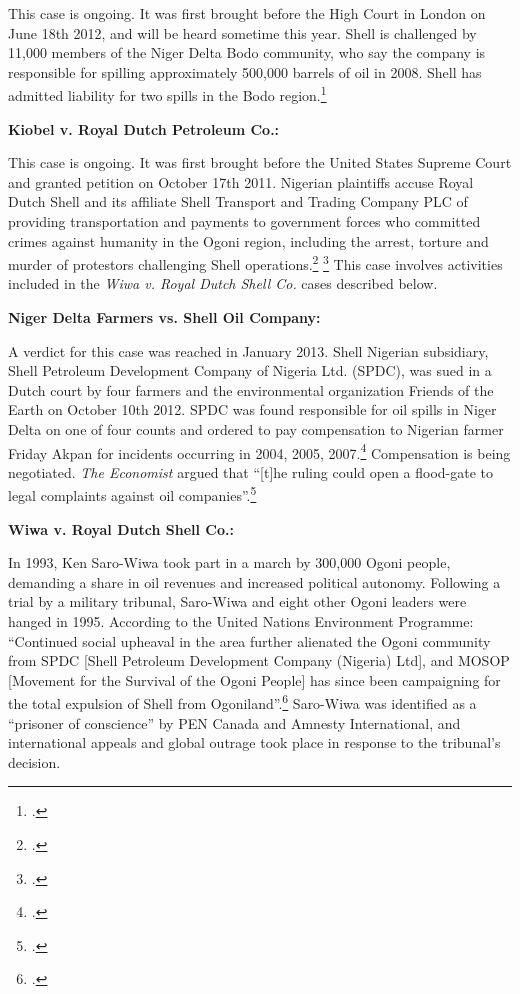 \documentclass[10pt]{article}
\begin{document}
This case is ongoing. 
It was first brought before the High Court in London on June 18th 2012, and will be heard sometime this year. 
Shell is challenged by 11,000 members of the Niger Delta Bodo community, who say the company is responsible for spilling approximately 500,000 barrels of oil in 2008. 
Shell has admitted liability for two spills in the Bodo region.\footcite{DutchResponsible}



\textbf{Kiobel v. Royal Dutch Petroleum Co.:} 



This case is ongoing. 
It was first brought before the United States Supreme Court and granted petition on October 17th 2011. 
Nigerian plaintiffs accuse Royal Dutch Shell and its affiliate Shell Transport and Trading Company PLC of providing transportation and payments to government forces who committed crimes against humanity in the Ogoni region, including the arrest, torture and murder of protestors challenging Shell operations.\footcite{KiobelShell} \footcite{TortureComplicity}
This case involves activities included in the \emph{Wiwa v. Royal Dutch Shell Co.} cases described below.



\textbf{Niger Delta Farmers vs. Shell Oil Company:} 



A verdict for this case was reached in January 2013. 
Shell Nigerian subsidiary, Shell Petroleum Development Company of Nigeria Ltd. (SPDC), was sued in a Dutch court by four farmers and the environmental organization Friends of the Earth on October 10th 2012. 
SPDC was found responsible for oil spills in Niger Delta on one of four counts and ordered to pay compensation to Nigerian farmer Friday Akpan for incidents occurring in 2004, 2005, 2007.\footcite{OrderedFarmer}
Compensation is being negotiated. 
\emph{The Economist} argued that ``[t]he ruling could open a flood-gate to legal complaints against oil companies''.\footcite{MixedVerdict}



\textbf{Wiwa v. Royal Dutch Shell Co.:}



In 1993, Ken Saro-Wiwa took part in a march by 300,000 Ogoni people, demanding a share in oil revenues and increased political autonomy.
Following a trial by a military tribunal, Saro-Wiwa and eight other Ogoni leaders were hanged in 1995.
According to the United Nations Environment Programme: ``Continued social upheaval in the area further alienated the Ogoni community from SPDC [Shell Petroleum Development Company (Nigeria) Ltd], and MOSOP [Movement for the Survival of the Ogoni People] has since been campaigning for the total expulsion of Shell from Ogoniland''.\footcite[][p.27]{Ogoniland}
Saro-Wiwa was identified as a ``prisoner of conscience'' by PEN Canada and Amnesty International, and international appeals and global outrage took place in response to the tribunal's decision.
\end{document}
